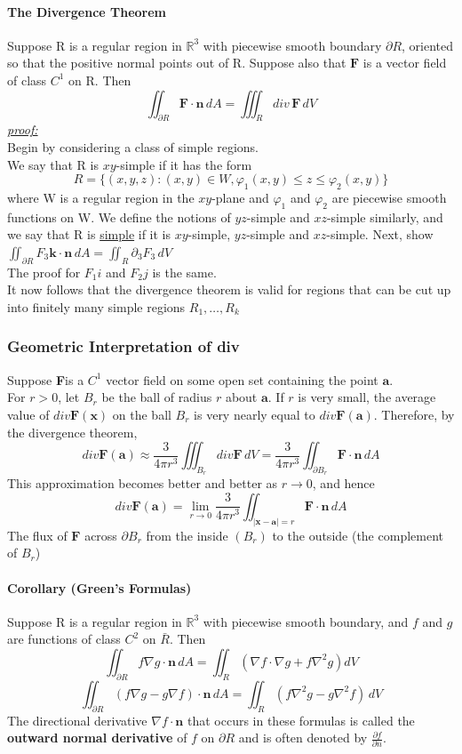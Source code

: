 \documentclass[11pt]{article}
\newcommand{\tb}[1]{\textbf{#1}}
\newcommand{\real}[0]{\mathbb{R}}
\newcommand{\under}[1]{\underline{#1}}
\newcommand{\proof}[0]{\textit{\underline{proof:} }}
\newcommand{\vx}[0]{\tb{x}}
\newcommand{\va}[0]{\tb{a}}
\newcommand{\vf}[0]{\tb{F}}
\newcommand{\vn}[0]{\tb{n}}
\newcommand{\p}[0]{\partial}
\begin{document}
\paragraph{The Divergence Theorem} Suppose R is a regular region in $\real^3$ with piecewise smooth boundary $\p R$, oriented so that the positive normal points out of R. Suppose also that $\vf$ is a vector field of class $C^1$ on R. Then
	$$\iint_{\p R}\vf\cdot\tb{n}\,dA = \iiint_R div\, \vf\,dV$$
\proof \\
Begin by considering a class of simple regions.\\
We say that R is $xy$-simple if it has the form
$$R = \{(x,y,z):(x,y)\in W,\varphi_1(x,y) \leq z \leq \varphi_2(x,y)\}$$
where W is a regular region in the $xy$-plane and  $\varphi_1$ and $\varphi_2$ are piecewise smooth functions on W. We define the notions of $yz$-simple and $xz$-simple similarly, and we say that R is \under{simple} if it is $xy$-simple, $yz$-simple and $xz$-simple.
Next, show $\iint_{\partial R}F_3\tb{k}\cdot\tb{n}\,dA = \iint_R \partial_3 F_3 \, dV$\\
The proof for $F_1i$ and $F_2 j$ is the same.\\
It now follows that the divergence theorem is valid for regions that can be cut up into finitely many simple regions $R_1, \hdots, R_k$

\subsubsection{Geometric Interpretation of div}
Suppose \vf is a $C^1$ vector field on some open set containing the point $\va$.\\
For $r > 0$, let $B_r$ be the ball of radius $r$ about $\va$. If $r$ is very small, the average value of $div \vf(\vx)$ on the ball $B_r$ is very nearly equal to $div\vf(\va)$. Therefore, by the divergence theorem,
$$div \vf(\va) \approx \frac{3}{4\pi r^3}\iiint_{B_r} div\vf \, dV = \frac{3}{4\pi r^3} \iint_{\partial B_r}\vf \cdot \vn \, dA$$
This approximation becomes better and better as $r \rightarrow 0$, and hence
$$div \vf(\va) = \underset{r\rightarrow 0}{\lim}\frac{3}{4 \pi r^3} \iint_{|\vx - \va| = r} \vf \cdot \vn \, dA$$
The flux of $\vf$ across $\partial B_r$ from the inside $(B_r) $ to the outside (the complement of $B_r$)




\paragraph{Corollary (Green's Formulas)} Suppose R is a regular region in $\real^3$ with piecewise smooth boundary, and $f$ and $g$ are functions of class $C^2$ on $\bar R$. Then
$$\iint_{\p R}f\nabla g\cdot \tb{n}\,dA = \iint_R(\nabla f \cdot \nabla g + f\nabla^2g)dV$$
$$\iint_{\p R} (f\nabla g - g\nabla f)\cdot\tb{n}\,dA = \iint_R(f\nabla^2g -g\nabla^2f)\,dV$$
The directional derivative $\nabla f\cdot\tb{n}$ that occurs in these formulas is called the \tb{outward normal derivative} of $f$ on $\p R$ and is often denoted by $\frac{\p f}{\p n}$.
\end{document}
